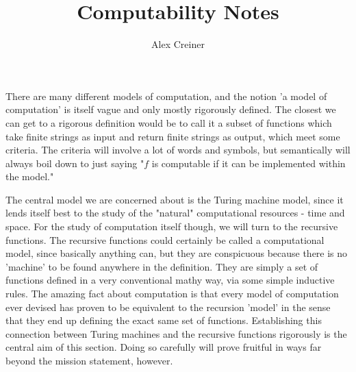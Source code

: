 \documentclass{article}
\title{Computability Notes}
\author{Alex Creiner}
\date{}
\theoremstyle{definition}
\theoremstyle{plain}
\theoremstyle{theorem}
\begin{document}
\maketitle

\tableofcontents

There are many different models of computation, and the notion 'a model of computation' is itself vague and only mostly rigorously defined. The closest we can get to a rigorous definition would be to call it a subset of functions which take finite strings as input and return finite strings as output, which meet some criteria. The criteria will involve a lot of words and symbols, but semantically will always boil down to just saying "$f$ is computable if it can be implemented within the model." 

The central model we are concerned about is the Turing machine model, since it lends itself best to the study of the "natural" computational resources - time and space. For the study of computation itself though, we will turn to the recursive functions. The recursive functions could certainly be called a computational model, since basically anything can, but they are conspicuous because there is no 'machine' to be found anywhere in the definition. They are simply a set of functions defined in a very conventional mathy way, via some simple inductive rules. The amazing fact about computation is that every model of computation ever devised has proven to be equivalent to the recursion 'model' in the sense that they end up defining the exact same set of functions. Establishing this connection between Turing machines and the recursive functions rigorously is the central aim of this section. Doing so carefully will prove fruitful in ways far beyond the mission statement, however.








\appendix


\printbibliography

\iffalse
\end{document}
